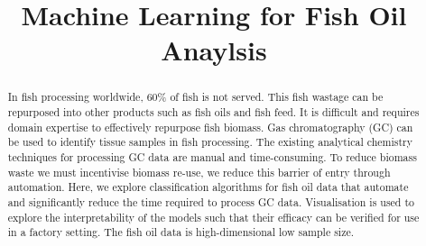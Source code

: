 \documentclass[runningheads]{llncs}
\begin{document}
%
\title{Machine Learning for Fish Oil Anaylsis}
%
%
%

%
\maketitle              %
%
\begin{abstract}
  
  In fish processing worldwide, 60\% of fish is not served. 
  This fish wastage can be repurposed into other products such as fish oils and fish feed.
  It is difficult and requires domain expertise to effectively repurpose fish biomass.
  Gas chromatography (GC) can be used to identify tissue samples in fish processing.
  The existing analytical chemistry techniques for processing GC data are manual and time-consuming.
  To reduce biomass waste we must incentivise biomass re-use, we reduce this barrier of entry through automation. 
  Here, we explore classification algorithms for fish oil data that automate and significantly reduce the time required to process GC data.
  Visualisation is used to explore the interpretability of the models such that their efficacy can be verified for use in a factory setting.
  The fish oil data is high-dimensional low sample size.
  
\end{abstract}
\end{document}
